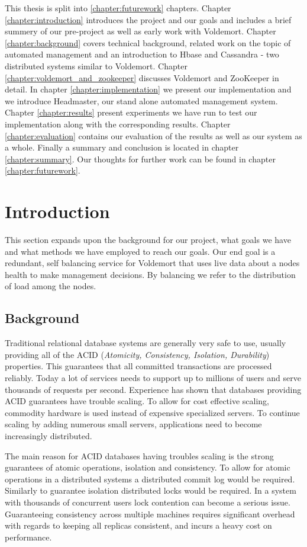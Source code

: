 
This thesis is split into \ref{chapter:futurework} chapters. Chapter \ref{chapter:introduction} introduces the project and our goals and includes a brief summery of our pre-project as well as early work with Voldemort. Chapter \ref{chapter:background} covers technical background, related work on the topic of automated management and an introduction to Hbase and Cassandra - two distributed systems similar to Voldemort. Chapter \ref{chapter:voldemort_and_zookeeper} discusses Voldemort and ZooKeeper in detail. In chapter \ref{chapter:implementation} we present our implementation and we introduce Headmaster, our stand alone automated management system. Chapter \ref{chapter:results} present experiments we have run to test our implementation along with the corresponding results. Chapter \ref{chapter:evaluation} contains our evaluation of the results as well as our system as a whole. Finally a summary and conclusion is located in chapter \ref{chapter:summary}. Our thoughts for further work can be found in chapter \ref{chapter:futurework}. 

\section{Introduction}
This section expands upon the background for our project, what goals we have and what methods we have employed to reach our goals. 
Our end goal is a redundant, self balancing service for Voldemort that uses live data about a nodes health to make management decisions. By balancing we refer to the distribution of load among the nodes.

\subsection{Background}
Traditional relational database systems are generally very safe to use, usually providing all of the ACID (\emph{Atomicity, Consistency, Isolation, Durability}) properties.
This guarantees that all committed transactions are processed reliably. 
Today a lot of services needs to support up to millions of users and serve thousands of requests per second. Experience has shown that databases providing ACID guarantees have trouble scaling. 
To allow for cost effective scaling, commodity hardware is used instead of expensive specialized servers. To continue scaling by adding numerous small servers, applications need to become increasingly distributed.

The main reason for ACID databases having troubles scaling is the strong guarantees of atomic operations, isolation and consistency. 
To allow for atomic operations in a distributed systems a distributed commit log would be required. 
Similarly to guarantee isolation distributed locks would be required. In a system with thousands of concurrent users lock contention can become a serious issue. 
Guaranteeing consistency across multiple machines requires significant overhead with regards to keeping all replicas consistent, and incurs a heavy cost on performance. 


